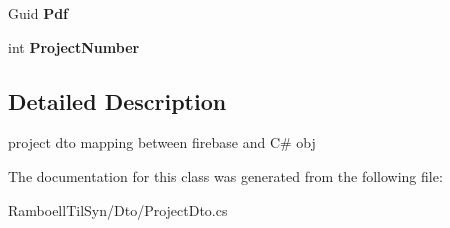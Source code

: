 \begin{DoxyCompactItemize}
\item 
\mbox{\label{class_ramboell_1_1i_o_s_1_1_dto_1_1_project_dto_af4276ffc21f423e2931c38243fe09660}} 
Guid {\bfseries Pdf}
\item 
\mbox{\label{class_ramboell_1_1i_o_s_1_1_dto_1_1_project_dto_aab3f4de4770ee3b72f0ad574329084cd}} 
int {\bfseries Project\+Number}
\end{DoxyCompactItemize}


\subsection{Detailed Description}
project dto mapping between firebase and C\# obj 



The documentation for this class was generated from the following file\+:\begin{DoxyCompactItemize}
\item 
Ramboell\+Til\+Syn/\+Dto/Project\+Dto.\+cs\end{DoxyCompactItemize}
